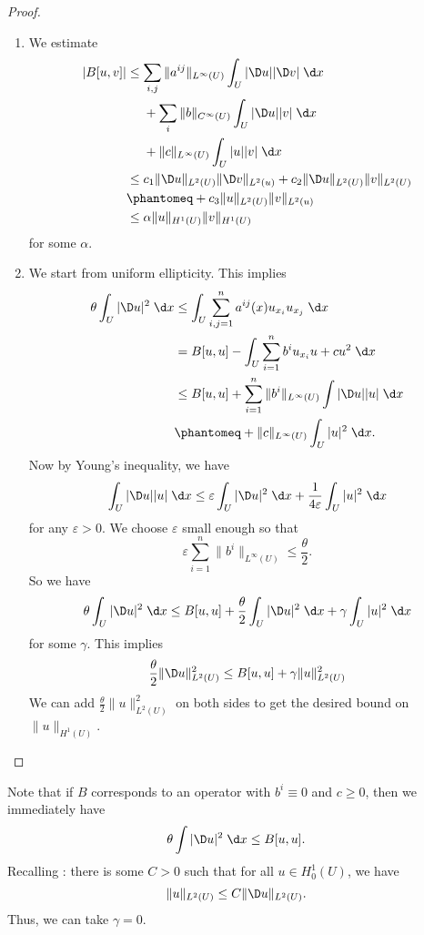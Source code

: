 \documentclass[a4paper]{article}
\begin{document}
\begin{proof}\leavevmode
  \begin{enumerate}
    \item We estimate
      \begin{align*}
        |B[u, v]| &\leq \sum_{i, j} \|a^{ij}\|_{L^\infty(U)} \int_U |\D u| |\D v|\;\d x\\
        &\hphantom{{ {}={}}}+ \sum_i \|b\|_{C^\infty(U)} \int_U |\D u| |v| \;\d x\\
        &\hphantom{{ {}={}}}+ \|c\|_{L^\infty(U)} \int_U |u| |v| \;\d x\\
        &\leq c_1 \|\D u\|_{L^2(U)} \|\D v\|_{L^2(u)} + c_2 \| \D u\|_{L^2(U)} \|v\|_{L^2(U)} \\
        &\phantomeq + c_3 \|u\|_{L^2(U)} \|v\|_{L^2(u)}\\
        &\leq \alpha \|u\|_{H^1(U)} \|v\|_{H^1(U)}
      \end{align*}
      for some $\alpha$.
    \item We start from uniform ellipticity. This implies
      \begin{align*}
        \theta \int_U |\D u|^2 \;\d x &\leq \int_U \sum_{i, j = 1}^n a^{ij}(x) u_{x_i} u_{x_j} \;\d x\\
        &= B[u ,u] - \int_U \sum_{i = 1}^n b^i u_{x_i} u + cu^2\;\d x\\
        &\leq B[u, u] + \sum_{i = 1}^n \|b^i\|_{L^\infty(U)} \int |\D u| |u| \;\d x \\
        &\phantomeq + \|c\|_{L^\infty(U)} \int_U |u|^2\;\d x.
      \end{align*}
      Now by Young's inequality, we have
      \[
        \int_U |\D u| |u| \;\d x \leq \varepsilon \int_U |\D u|^2 \;\d x + \frac{1}{4\varepsilon}\int_U |u|^2 \;\d x
      \]
      for any $\varepsilon > 0$. We choose $\varepsilon$ small enough so that
      \[
        \varepsilon\sum_{i = 1}^n \|b^i\|_{L^\infty(U)} \leq \frac{\theta}{2}.
      \]
      So we have
      \[
        \theta \int_U |\D u|^2 \;\d x \leq B[u, u] + \frac{\theta}{2} \int_U |\D u|^2 \;\d x + \gamma \int_U |u|^2\;\d x
      \]
      for some $\gamma$. This implies
      \[
        \frac{\theta}{2} \| \D u\|_{L^2(U)}^2 \leq B[u, u] + \gamma \|u\|_{L^2(U)}^2
      \]
      We can add $\frac{\theta}{2}\|u\|_{L^2(U)}^2$ on both sides to get the desired bound on $\|u\|_{H^1(U)}$.
  \end{enumerate}
\end{proof}
Note that if $B$ corresponds to an operator with $b^i \equiv 0$ and $c \geq 0$, then we immediately have
\[
  \theta \int |\D u|^2 \;\d x \leq B[u, u].
\]
Recalling : there is some $C > 0$ such that for all $u \in H_0^1 (U)$, we have
\[
  \|u\|_{L^2(U)} \leq C \|\D u\|_{L^2(U)}.
\]
Thus, we can take $\gamma = 0$.
\end{document}
